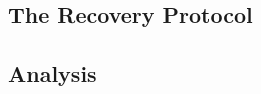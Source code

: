 \subsection{The Recovery Protocol}\label{subsec:recovery}

\subsection{Analysis}\label{subsec:consensus-math}
